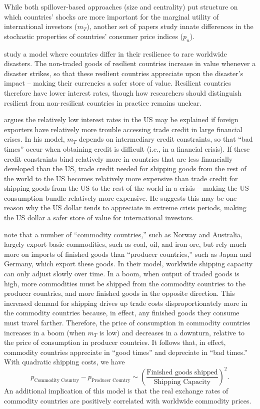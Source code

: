\documentclass{ar-1col}
\begin{document}
While both spillover-based approaches (size and centrality) put structure on which countries' shocks are more important for the marginal utility of international investors ($m_T$), another set of papers study innate differences in the stochastic properties of countries' consumer price indices ($p_n$).

\citet{FarhiGabaix2016} study a model where countries differ in their resilience to rare worldwide disasters. The non-traded goods of resilient countries increase in value whenever a disaster strikes, so that these resilient countries appreciate upon the disaster's impact -- making their currencies a safer store of value. Resilient countries therefore have lower interest rates, though how researchers should distinguish resilient from non-resilient countries in practice remains unclear.

\citet{Maggiori2013} argues the relatively low interest rates in the US may be explained if foreign exporters have relatively more trouble accessing trade credit in large financial crises. In his model, $m_T$ depends on intermediary credit constraints, so that ``bad times'' occur when obtaining credit is difficult (i.e., in a financial crisis). If these credit constraints bind relatively more in countries that are less financially developed than the US, trade credit needed for shipping goods from the rest of the world to the US becomes relatively more expensive than trade credit for shipping goods from the US to the rest of the world in a crisis -- making the US consumption bundle relatively more expensive. He suggests this may be one reason why the US dollar tends to appreciate in extreme crisis periods, making the US dollar a safer store of value for international investors.

\citet{Readyetal2013} note that a number of ``commodity countries,'' such as Norway and Australia, largely export basic commodities, such as coal, oil, and iron ore, but rely much more on imports of finished goods than ``producer countries,'' such as Japan and Germany, which export these goods. In their model, worldwide shipping capacity can only adjust slowly over time. In a boom, when output of traded goods is high, more commodities must be shipped from the commodity countries to the producer countries, and more finished goods in the opposite direction. This increased demand for shipping drives up trade costs disproportionately more in the commodity countries because, in effect, any finished goods they consume must travel farther. Therefore, the price of consumption in commodity countries increases in a boom (when $m_T$ is low) and decreases in a downturn, relative to the price of consumption in producer countries. It follows that, in effect, commodity countries appreciate in ``good times'' and depreciate in ``bad times.'' With quadratic shipping costs, we have
\begin{equation*}
  p_{\text{Commodity Country}}-p_{\text{Producer Country}}\sim\left(\frac{\text{Finished goods shipped}}{\text{Shipping Capacity}}\right)^2.
\end{equation*}
An additional implication of this model is that the real exchange rates of commodity countries are positively correlated with worldwide commodity prices. 
\end{document}
